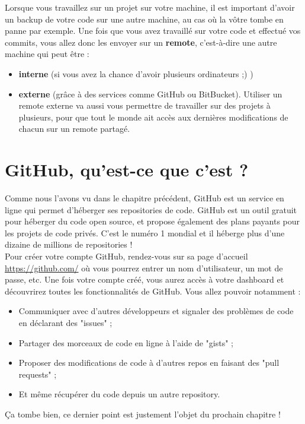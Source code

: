 Lorsque vous travaillez sur un projet sur votre machine, il est important d'avoir un backup de votre code sur une autre machine, au cas où la vôtre tombe en panne par exemple. Une fois que vous avez travaillé sur votre code et effectué vos commits, vous allez donc les envoyer sur un \textbf{remote}, c'est-à-dire une autre machine qui peut être : 

\begin{itemize}
\item \textbf{interne} (si vous avez la chance d'avoir plusieurs ordinateurs ;) )
\item \textbf{externe} (grâce à des services comme GitHub ou BitBucket). Utiliser un remote externe va aussi vous permettre de travailler sur des projets à plusieurs, pour que tout le monde ait accès aux dernières modifications de chacun sur un remote partagé. 
\end{itemize}


\section{GitHub, qu'est-ce que c'est ?}
Comme nous l'avons vu dans le chapitre précédent, GitHub est un service en ligne qui permet d'héberger ses repositories de code. GitHub est un outil gratuit pour héberger du code open source, et propose également des plans payants pour les projets de code privés. C'est le numéro 1 mondial et il héberge plus d'une dizaine de millions de repositories ! \\

Pour créer votre compte GitHub, rendez-vous sur sa page d'accueil \url{https://github.com/} où vous pourrez entrer un nom d'utilisateur, un mot de passe, etc. Une fois votre compte créé, vous aurez accès à votre dashboard et découvrirez toutes les fonctionnalités de GitHub. Vous allez pouvoir notamment : 
\begin{itemize}
\item Communiquer avec d'autres développeurs et signaler des problèmes de code en déclarant des "issues" ;
\item Partager des morceaux de code en ligne à l'aide de "gists" ;
\item Proposer des modifications de code à d'autres repos en faisant des "pull requests" ;
\item Et même récupérer du code depuis un autre repository.
\end{itemize}
Ça tombe bien, ce dernier point est justement l'objet du prochain chapitre !


